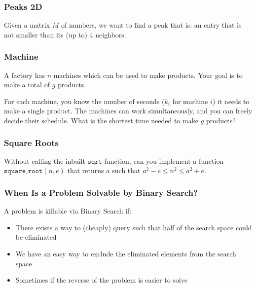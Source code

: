 \documentclass{beamer}
\begin{document}
\begin{frame}[fragile]
\frametitle{Peaks 2D}

Given a matrix $M$ of numbers, we want to find a peak that is: an entry that is not smaller than its (up to) 4 neighbors.
\end{frame}

\begin{frame}
\end{frame}

\begin{frame}
\end{frame}

\begin{frame}[fragile]
\frametitle{Machine}

A factory has $n$ machines which can be used to make products. Your goal is to make a total of $g$ products.

For each machine, you know the number of seconds ($k_i$ for machine $i$) it needs to make a single product. The machines can work simultaneously, and you can freely decide their schedule. What is the shortest time needed to make $g$ products?
\end{frame}

\begin{frame}
\end{frame}

\begin{frame}
\end{frame}

\begin{frame}[fragile]
\frametitle{Square Roots}

Without calling the inbuilt $\texttt{sqrt}$ function, can you implement a function $\texttt{square\_root}(n, e)$ that returns $a$ such that $a^2 - e \leq n^2 \leq a^2 + e$.
\end{frame}

\begin{frame}
\end{frame}

\begin{frame}
\end{frame}

\begin{frame}[fragile]
\frametitle{When Is a Problem Solvable by Binary Search?}

A problem is killable via Binary Search if:
\begin{itemize}
\item There exists a way to (cheaply) query such that half of the search space could be eliminated
\item We have an easy way to exclude the eliminated elements from the search space
\item Sometimes if the reverse of the problem is easier to solve
\end{itemize}

\end{frame}
\end{document}
